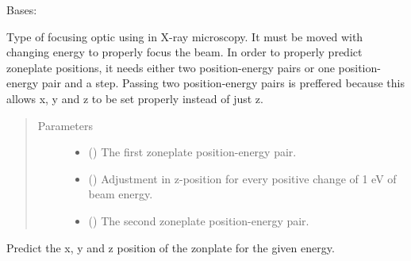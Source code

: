 \documentclass[letterpaper,10pt,english]{sphinxmanual}
\begin{document}
\begin{fulllineitems}
\label{\detokenize{xanespy:xanespy.beamlines.Zoneplate}}
Bases: 

Type of focusing optic using in X-ray microscopy. It must be moved
with changing energy to properly focus the beam. In order to
properly predict zoneplate positions, it needs either two
position-energy pairs or one position-energy pair and a
step. Passing two position-energy pairs is preffered because this
allows x, y and z to be set properly instead of just z.
\begin{quote}\begin{description}
\item[{Parameters}] \leavevmode\begin{itemize}
\item {} 
 () \textendash{} The first zoneplate position-energy pair.

\item {} 
 (\sphinxstyleliteralemphasis{, }) \textendash{} Adjustment in z-position for every positive change of 1 eV
of beam energy.

\item {} 
 (\sphinxstyleliteralemphasis{, }) \textendash{} The second zoneplate position-energy pair.

\end{itemize}

\end{description}\end{quote}

\begin{fulllineitems}
\label{\detokenize{xanespy:xanespy.beamlines.Zoneplate.position}}
Predict the x, y and z position of the zonplate for the given
energy.

\end{fulllineitems}


\end{fulllineitems}
\end{document}
